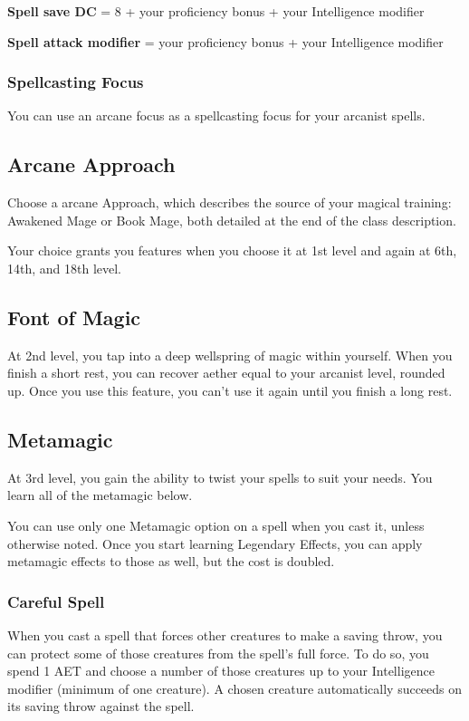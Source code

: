 \textbf{Spell save DC} = 8 + your proficiency bonus + your Intelligence modifier

\textbf{Spell attack modifier} = your proficiency bonus + your Intelligence modifier

\subsubsection{Spellcasting Focus}

You can use an arcane focus as a spellcasting focus for your arcanist spells.

\subsection{Arcane Approach}

Choose a arcane Approach, which describes the source of your magical training: Awakened Mage or Book Mage, both detailed at the end of the class description.

Your choice grants you features when you choose it at 1st level and again at 6th, 14th, and 18th level.

\subsection{Font of Magic}

At 2nd level, you tap into a deep wellspring of magic within yourself. When you finish a short rest, you can recover aether equal to your arcanist level, rounded up. Once you use this feature, you can't use it again until you finish a long rest.

\subsection{Metamagic}

At 3rd level, you gain the ability to twist your spells to suit your needs. You learn all of the metamagic below.

You can use only one Metamagic option on a spell when you cast it, unless otherwise noted. Once you start learning Legendary Effects, you can apply metamagic effects to those as well, but the cost is doubled.

\subsubsection{Careful Spell}

When you cast a spell that forces other creatures to make a saving throw, you can protect some of those creatures from the spell's full force. To do so, you spend 1 AET and choose a number of those creatures up to your Intelligence modifier (minimum of one creature). A chosen creature automatically succeeds on its saving throw against the spell.

